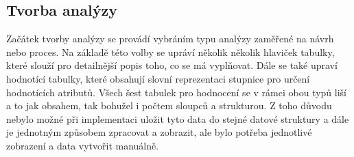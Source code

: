 \newpage
\subsection{Tvorba analýzy}
Začátek tvorby analýzy se provádí vybráním typu analýzy zaměřené na návrh nebo proces. Na základě této volby se upráví několik několik hlaviček tabulky, které slouží pro detailnější popis toho, co se má vyplňovat. Dále se také upraví hodnotící tabulky, které obsahují slovní reprezentaci stupnice pro určení hodnotících atributů. Všech šest tabulek pro hodnocení se v rámci obou typů liší a to jak obsahem, tak bohužel i počtem sloupců a strukturou. Z toho důvodu nebylo možné při implementaci uložit tyto data do stejné datové struktury a dále je jednotným způsobem zpracovat a zobrazit, ale bylo potřeba jednotlivé zobrazení a data vytvořit manuálně. 

